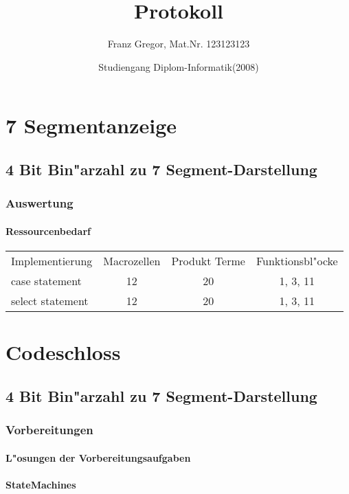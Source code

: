 \documentclass [] {scrartcl}
\begin{document}
  \subject{Praktikums Programmierbare Schaltkreise}
  \title{Protokoll}
  \author{Franz Gregor, Mat.Nr. 123123123 \and Studiengang Diplom-Informatik(2008)}

  \maketitle

  \section{7 Segmentanzeige}
  \subsection{4 Bit Bin"arzahl zu 7 Segment-Darstellung}
  \subsubsection{Auswertung}
  \paragraph{Ressourcenbedarf}
  \begin{table}
    \begin{tabular}{lccc}
      Implementierung & Macrozellen & Produkt Terme & Funktionsbl"ocke\\
      case statement & 12 & 20 & 1, 3, 11\\
      select statement & 12 & 20 & 1, 3, 11\\
    \end{tabular}
  \end{table}

  \section{Codeschloss}
  \subsection{4 Bit Bin"arzahl zu 7 Segment-Darstellung}
  \subsubsection{Vorbereitungen}
  \paragraph{L"osungen der Vorbereitungsaufgaben}
  \paragraph{StateMachines}
\end{document}
